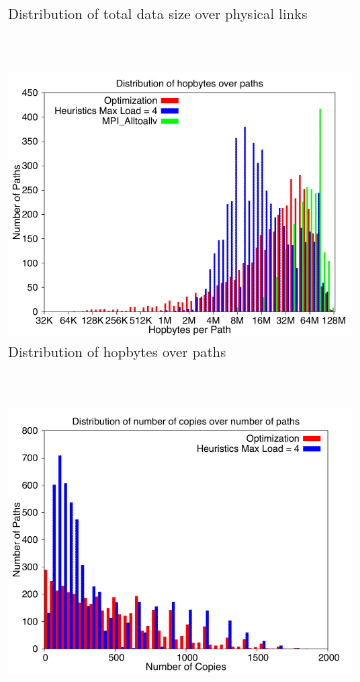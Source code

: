 \begin{figure}[!htbp]
\begin{subfigure}[b]{0.49\textwidth}
                \caption{Distribution of total data size over physical links}
                \label{fig:87_4096_loaddata}
        \end{subfigure}
        ~ %
        \begin{subfigure}[b]{0.49\textwidth}
                \includegraphics[width=\textwidth]{report_figures/constantr/87_4096/hopbyte_histo.pdf}
                \caption{Distribution of hopbytes over paths}
                \label{fig:87_4096_hopbyte}
        \end{subfigure}
        ~ %
        \begin{subfigure}[b]{0.49\textwidth}
                \includegraphics[width=\textwidth]{report_figures/constantr/87_4096/hopcopy_histo.pdf}

\end{subfigure}
\end{figure}
